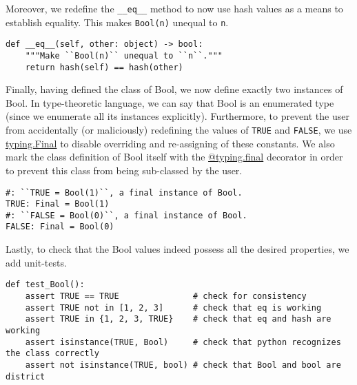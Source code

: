 \documentclass[11pt]{article}
\begin{document}
Moreover, we redefine the \texttt{\_\_eq\_\_} method to now use hash values as a means to
establish equality.  This makes \texttt{Bool(n)} unequal to \texttt{n}.
\begin{verbatim}
def __eq__(self, other: object) -> bool:
    """Make ``Bool(n)`` unequal to ``n``."""
    return hash(self) == hash(other)
\end{verbatim}


Finally, having defined the class of Bool, we now define exactly two
instances of Bool. In type-theoretic language, we can say that Bool is an
enumerated type (since we enumerate all its instances explicitly).
Furthermore, to prevent the user from accidentally (or maliciously)
redefining the values of \texttt{TRUE} and \texttt{FALSE}, we use \href{https://docs.python.org/3/library/typing.html?\#typing.Final}{typing.Final} to disable
overriding and re-assigning of these constants. We also mark the class
definition of Bool itself with the \href{https://docs.python.org/3/library/typing.html?\#typing.final}{@typing.final} decorator in order to
prevent this class from being sub-classed by the user.
\begin{verbatim}
#: ``TRUE = Bool(1)``, a final instance of Bool.
TRUE: Final = Bool(1)
#: ``FALSE = Bool(0)``, a final instance of Bool.
FALSE: Final = Bool(0)
\end{verbatim}

Lastly, to check that the Bool values indeed possess all the desired properties,
we add unit-tests.
\begin{verbatim}
def test_Bool():
    assert TRUE == TRUE               # check for consistency
    assert TRUE not in [1, 2, 3]      # check that eq is working
    assert TRUE in {1, 2, 3, TRUE}    # check that eq and hash are working
    assert isinstance(TRUE, Bool)     # check that python recognizes the class correctly
    assert not isinstance(TRUE, bool) # check that Bool and bool are district
\end{verbatim}
\end{document}
